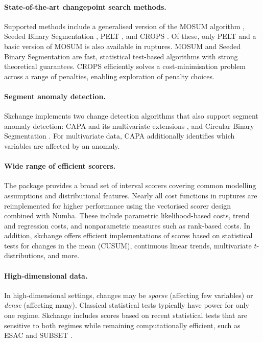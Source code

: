 \documentclass[twoside,11pt]{article}
\begin{document}
\paragraph{State-of-the-art changepoint search methods.}
Supported methods include a generalised version of the MOSUM algorithm \citep{eichinger2018mosum, meier2021mosum}, Seeded Binary Segmentation \citep{kovacs2023seeded}, PELT \citep{killick2012optimal}, and CROPS \citep{haynes2017crops}. Of these, only PELT and a basic version of MOSUM is also available in ruptures.
MOSUM and Seeded Binary Segmentation are fast, statistical test-based algorithms with strong theoretical guarantees.
CROPS efficiently solves a cost-minimisation problem across a range of penalties, enabling exploration of penalty choices.

\paragraph{Segment anomaly detection.}
Skchange implements two change detection algorithms that also support segment anomaly detection:
CAPA and its multivariate extensions \citep{fisch2022capa, fisch2022mvcapa}, and Circular Binary Segmentation \citep{olshen2004circular}.
For multivariate data, CAPA additionally identifies which variables are affected by an anomaly.

\paragraph{Wide range of efficient scorers.}
The package provides a broad set of interval scorers covering common modelling assumptions and distributional features.
Nearly all cost functions in ruptures are reimplemented for higher performance using the vectorised scorer design combined with Numba.
These include parametric likelihood-based costs, trend and regression costs, and nonparametric measures such as rank-based costs.
In addition, skchange offers efficient implementations of scores based on statistical tests for changes in the mean (CUSUM), continuous linear trends, multivariate $t$-distributions, and more.

\paragraph{High-dimensional data.}
In high-dimensional settings, changes may be \emph{sparse} (affecting few variables) or \emph{dense} (affecting many). Classical statistical tests typically have power for only one regime.
Skchange includes scores based on recent statistical tests that are sensitive to both regimes while remaining computationally efficient, such as ESAC \citep{moen2024esac} and SUBSET \citep{tickle2021computationally}.
\end{document}
